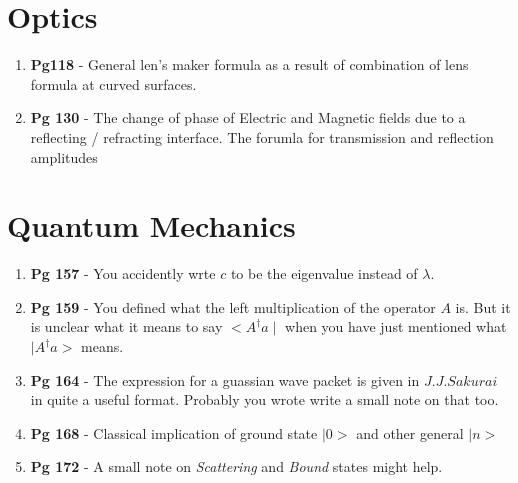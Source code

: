 \documentclass{article}
\begin{document}
\section{Optics}
\begin{enumerate}
\item \textbf{Pg118} - General len's maker formula as a result of combination of lens formula at curved surfaces.
\item \textbf{Pg 130} - The change of phase of Electric and Magnetic fields due to a reflecting / refracting interface. The forumla for transmission and reflection amplitudes
\end{enumerate}
\section{Quantum Mechanics}
\begin{enumerate}
\item \textbf{Pg 157} - You accidently wrte $c$ to be the eigenvalue instead of $\lambda$.
\item \textbf{Pg 159} - You defined what the left multiplication of the operator $A$ is. But it is unclear what it means to say $<A^\dagger a \mid$ when you have just mentioned what $\mid A^\dagger a>$ means.
\item \textbf{Pg 164} - The expression for a guassian wave packet is given in $J.J.Sakurai$ in quite a useful format. Probably you wrote write a small note on that too.
\item \textbf{Pg 168} - Classical implication of ground state $\mid 0 >$ and other general $\mid n>$
\item \textbf{Pg 172} - A small note on \textit{Scattering} and \textit{Bound} states might help.
\end{enumerate}
\end{document}
